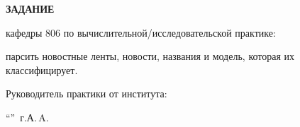 \begin{center}
\bfseries{\large ЗАДАНИЕ}
\end{center}

кафедры 806 по вычислительной/исследовательской практике:

парсить новостные ленты, новости, названия и модель, которая их классифицирует.

\vspace*{\fill}
Руководитель практики от института: 

\vspace{5pt}
\enquote{\hspace{0.5cm}}  \the\year\,г. А.\,A. 
\pagebreak